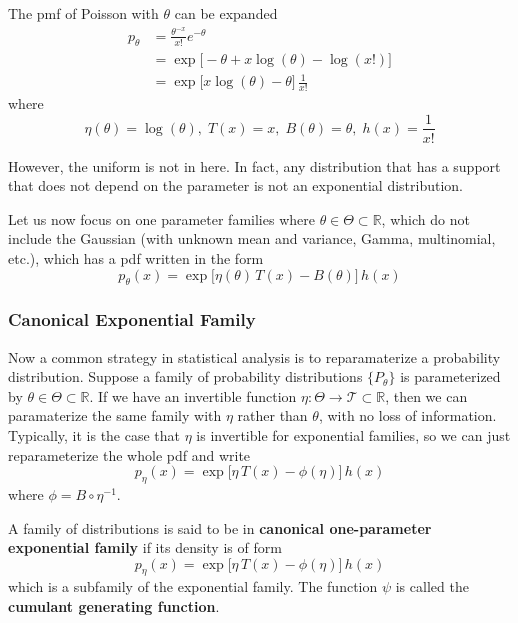   \begin{example}[Poisson]
  The pmf of Poisson with $\theta$ can be expanded 
  \begin{align*}
      p_\theta & = \frac{\theta^{-x}}{x!} e^{-\theta} \\
      & = \exp \big[ -\theta + x\log(\theta) - \log(x!) \big] \\
      & = \exp \big[ x \log(\theta) - \theta \big] \, \frac{1}{x!}
  \end{align*}
  where 
  \[\eta(\theta) = \log(\theta), \; T(x) = x, \; B(\theta) = \theta, \; h(x) = \frac{1}{x!}\]
  \end{example}

  However, the uniform is not in here. In fact, any distribution that has a support that does not depend on the parameter is not an exponential distribution. 

  Let us now focus on one parameter families where $\theta \in \Theta \subset \mathbb{R}$, which do not include the Gaussian (with unknown mean and variance, Gamma, multinomial, etc.), which has a pdf written in the form 
  \[p_\theta (x) = \exp \big[ \eta (\theta) \, T(x) - B(\theta) \big] \, h(x)\]


  \subsubsection{Canonical Exponential Family}

    Now a common strategy in statistical analysis is to reparamaterize a probability distribution. Suppose a family of probability distributions $\{P_\theta\}$ is parameterized by $\theta \in \Theta \subset \mathbb{R}$. If we have an invertible function $\eta: \Theta \rightarrow \mathcal{T} \subset \mathbb{R}$, then we can paramaterize the same family with $\eta$ rather than $\theta$, with no loss of information. Typically, it is the case that $\eta$ is invertible for exponential families, so we can just reparameterize the whole pdf and write 
    \[p_\eta (x) = \exp \big[ \eta \, T(x) - \phi(\eta) \big] \, h(x)\]
    where $\phi = B \circ \eta^{-1}$. 

    \begin{definition}
    A family of distributions is said to be in \textbf{canonical one-parameter exponential family} if its density is of form 
    \[p_\eta (x) = \exp \big[ \eta \, T(x) - \phi(\eta) \big] \, h(x)\]
    which is a subfamily of the exponential family. The function $\psi$ is called the \textbf{cumulant generating function}. 
    \end{definition}

